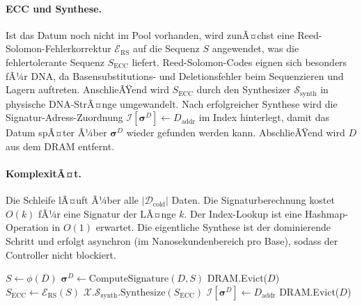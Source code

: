 ﻿\documentclass[a4paper,12pt]{article}
\theoremstyle{definition}
\begin{document}
\paragraph{ECC und Synthese.}
Ist das Datum noch nicht im Pool vorhanden, wird zunÃ¤chst eine Reed-Solomon-Fehlerkorrektur $\mathcal{E}_{\mathrm{RS}}$ auf die Sequenz $S$ angewendet, was die fehlertolerante Sequenz $S_{\mathrm{ECC}}$ liefert. Reed-Solomon-Codes eignen sich besonders fÃ¼r DNA, da Basensubstitutions- und Deletionsfehler beim Sequenzieren und Lagern auftreten. AnschlieÃŸend wird $S_{\mathrm{ECC}}$ durch den Synthesizer $\mathcal{S}_{\mathrm{synth}}$ in physische DNA-StrÃ¤nge umgewandelt. Nach erfolgreicher Synthese wird die Signatur-Adress-Zuordnung $\mathcal{I}[\boldsymbol{\sigma}^D] \gets D_{\mathrm{addr}}$ im Index hinterlegt, damit das Datum spÃ¤ter Ã¼ber $\boldsymbol{\sigma}^D$ wieder gefunden werden kann. AbschlieÃŸend wird $D$ aus dem DRAM entfernt.

\paragraph{KomplexitÃ¤t.}
Die Schleife lÃ¤uft Ã¼ber alle $|\mathcal{D}_{\mathrm{cold}}|$ Daten. Die Signaturberechnung kostet $O(k)$ fÃ¼r eine Signatur der LÃ¤nge $k$. Der Index-Lookup ist eine Hashmap-Operation in $O(1)$ erwartet. Die eigentliche Synthese ist der dominierende Schritt und erfolgt asynchron (im Nanosekundenbereich pro Base), sodass der Controller nicht blockiert.

\begin{algorithm}[H]
  \caption{DNA-Demotion-Algorithmus}
  \label{alg:demotion}
  \begin{algorithmic}[1]
      \State $S \gets \phi(D)$ 
      \State $\boldsymbol{\sigma}^D \gets \mathrm{ComputeSignature}(D, S)$
       
        \State DRAM.Evict($D$)
      \Else
        \State $S_{\mathrm{ECC}} \gets \mathcal{E}_{\mathrm{RS}}(S)$
        \State $\mathcal{X}.\mathcal{S}_{\mathrm{synth}}.\mathrm{Synthesize}(S_{\mathrm{ECC}})$
        \State $\mathcal{I}[\boldsymbol{\sigma}^D] \gets D_{\mathrm{addr}}$
        \State DRAM.Evict($D$)
      \EndIf
    \EndFor
  \end{algorithmic}
\end{algorithm}
\end{document}
